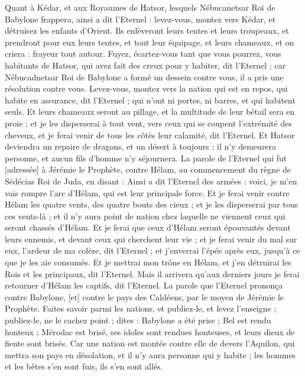 \begin{multicols}{2}
Quant à Kédar, et aux Royaumes de Hatsor, lesquels Nébucanetsar Roi de Babylone frappera, ainsi a dit l'Eternel : levez-vous, montez vers Kédar, et détruisez les enfants d'Orient.
Ils enlèveront leurs tentes et leurs troupeaux, et prendront pour eux leurs tentes, et tout leur équipage, et leurs chameaux, et on criera : frayeur tout autour.
Fuyez, écartez-vous tant que vous pourrez, vous habitants de Hatsor, qui avez fait des creux pour y habiter, dit l'Eternel ; car Nébucadnetsar Roi de Babylone a formé un dessein contre vous, il a pris une résolution contre vous.
Levez-vous, montez vers la nation qui est en repos, qui habite en assurance, dit l'Eternel ; qui n'ont ni portes, ni barres, et qui habitent seuls.
Et leurs chameaux seront au pillage, et la multitude de leur bétail sera en proie ; et je les disperserai à tout vent, vers ceux qui se coupent l'extrémité des cheveux, et je ferai venir de tous les côtés leur calamité, dit l'Eternel.
Et Hatsor deviendra un repaire de dragons, et un désert à toujours ; il n'y demeurera personne, et aucun fils d'homme n'y séjournera.
La parole de l'Eternel qui fut [adressée] à Jérémie le Prophète, contre Hélam, au commencement du règne de Sédécias Roi de Juda, en disant :
Ainsi a dit l'Eternel des armées : voici, je m'en vais rompre l'arc d'Hélam, qui est leur principale force.
Et je ferai venir contre Hélam les quatre vents, des quatre bouts des cieux ; et je les disperserai par tous ces vents-là ; et il n'y aura point de nation chez laquelle ne viennent ceux qui seront chassés d'Hélam.
Et je ferai que ceux d'Hélam seront épouvantés devant leurs ennemis, et devant ceux qui cherchent leur vie ; et je ferai venir du mal sur eux, l'ardeur de ma colère, dit l'Eternel ; et j'enverrai l'épée après eux, jusqu’à ce que je les aie consumés.
Et je mettrai mon trône en Hélam, et j'en détruirai les Rois et les principaux, dit l'Eternel.
Mais il arrivera qu'aux derniers jours je ferai retourner d'Hélam les captifs, dit l'Eternel.
\VerseOne{}La parole que l'Eternel prononça contre Babylone, [et] contre le pays des Caldéens, par le moyen de Jérémie le Prophète.
Faites savoir parmi les nations, et publiez-le, et levez l'enseigne ; publiez-le, ne le cachez point ; dites : Babylone a été prise ; Bel est rendu honteux ; Mérodac est brisé, ses idoles sont rendues honteuses, et leurs dieux de fiente sont brisés.
Car une nation est montée contre elle de devers l'Aquilon, qui mettra son pays en désolation, et il n'y aura personne qui y habite ; les hommes et les bêtes s'en sont fuis, ils s'en sont allés.

\end{multicols}
